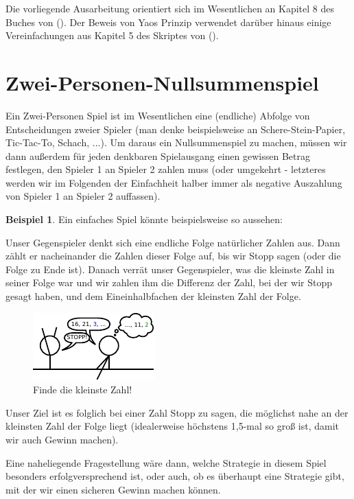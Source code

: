 \documentclass[a4paper,ngerman,12pt,bibtotoc]{scrartcl}
\theoremstyle{definition}
\newtheorem{bsp}[defn]{Beispiel}
\theoremstyle{plain}
\theoremstyle{remark}
\renewcommand{\_}{\mathpunct{.}\,}
\newcommand{\?}{\,{:}\,}
\newcommand{\ZPNS}{Zwei-Personen-Nullsummenspiel }
\begin{document}
	Die vorliegende Ausarbeitung orientiert sich im Wesentlichen an Kapitel 8 des Buches  von \citeauthor{OCCA} (\cite{OCCA}). Der Beweis von Yaos Prinzip verwendet darüber hinaus einige Vereinfachungen aus Kapitel 5 des Skriptes  von \citeauthor{OO} (\cite{OO}).
	

	\section{\ZPNS}
	
	
	Ein Zwei-Personen Spiel ist im Wesentlichen eine (endliche) Abfolge von Entscheidungen zweier Spieler (man denke beispielsweise an Schere-Stein-Papier, Tic-Tac-To, Schach, ...). Um daraus ein Nullsummenspiel zu machen, müssen wir dann außerdem für jeden denkbaren Spielausgang einen gewissen Betrag festlegen, den Spieler 1 an Spieler 2 zahlen muss (oder umgekehrt - letzteres werden wir im Folgenden der Einfachheit halber immer als negative Auszahlung von Spieler 1 an Spieler 2 auffassen). 
	
	\begin{bsp}\label{bsp:teil1}
		Ein einfaches Spiel könnte beispielsweise so aussehen: 
		
		Unser Gegenspieler denkt sich eine endliche Folge natürlicher Zahlen aus. Dann zählt er nacheinander die Zahlen dieser Folge auf, bis wir \glqq Stopp\grqq{} sagen (oder die Folge zu Ende ist). Danach verrät unser Gegenspieler, was die kleinste Zahl in seiner Folge war und wir zahlen ihm die Differenz der Zahl, bei der wir \glqq Stopp\grqq{} gesagt haben, und dem Eineinhalbfachen der kleinsten Zahl der Folge.
		
		\begin{figure}[h]
			\centering
			\includegraphics[width=0.45\linewidth]{../Bilder/Comic}
			\caption{\small Finde die kleinste Zahl!}
			\label{fig:Comic}
		\end{figure}

		
		Unser Ziel ist es folglich bei einer Zahl \glqq Stopp\grqq{} zu sagen, die möglichst nahe an der kleinsten Zahl der Folge liegt (idealerweise höchstens 1,5-mal so groß ist, damit wir auch Gewinn machen).
		
		Eine naheliegende Fragestellung wäre dann, welche Strategie in diesem Spiel besonders erfolgversprechend ist, oder auch, ob es überhaupt eine Strategie gibt, mit der wir einen sicheren Gewinn machen können.
	\end{bsp}
	
\end{document}
